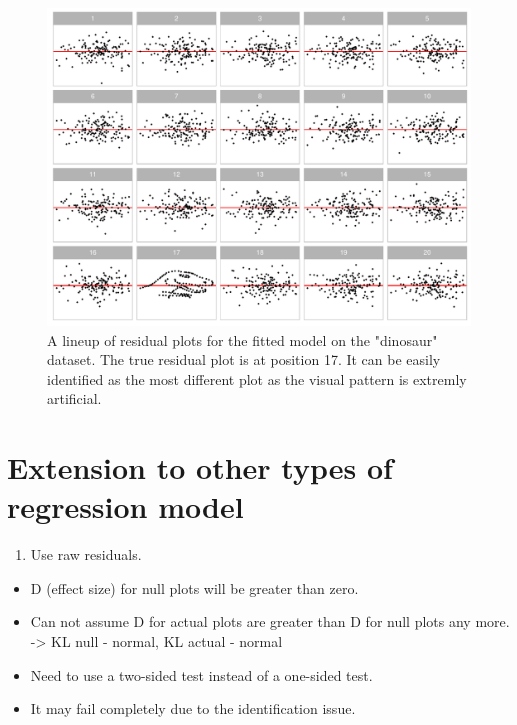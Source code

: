 \documentclass[]{interact}
\theoremstyle{plain}%
\theoremstyle{definition}
\theoremstyle{remark}
\providecommand{\tightlist}{%
  \setlength{\itemsep}{0pt}\setlength{\parskip}{0pt}}
\def\tightlist{}
\begin{document}
\begin{figure}[!h]

{\centering \includegraphics[width=1\linewidth]{paper_files/figure-latex/dino-lineup-1} 

}

\caption{A lineup of residual plots for the fitted model on the "dinosaur" dataset. The true residual plot is at position 17. It can be easily identified as the most different plot as the visual pattern is extremly artificial.}\label{fig:dino-lineup}
\end{figure}

\section{Extension to other types of regression
model}\label{extension-to-other-types-of-regression-model}

\begin{enumerate}
\def\labelenumi{\arabic{enumi}.}
\tightlist
\item
  Use raw residuals.
\end{enumerate}

\begin{itemize}
\tightlist
\item
  D (effect size) for null plots will be greater than zero.
\item
  Can not assume D for actual plots are greater than D for null plots
  any more. -\textgreater{} KL null - normal, KL actual - normal
\item
  Need to use a two-sided test instead of a one-sided test.
\item
  It may fail completely due to the identification issue.
\end{itemize}
\end{document}
